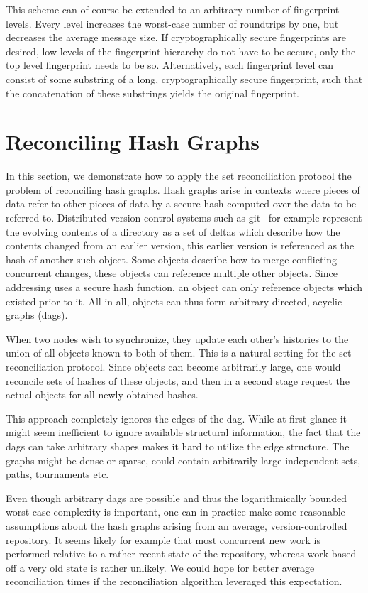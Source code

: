 This scheme can of course be extended to an arbitrary number of fingerprint levels. Every level increases the worst-case number of roundtrips by one, but decreases the average message size. If cryptographically secure fingerprints are desired, low levels of the fingerprint hierarchy do not have to be secure, only the top level fingerprint needs to be so. Alternatively, each fingerprint level can consist of some substring of a long, cryptographically secure fingerprint, such that the concatenation of these substrings yields the original fingerprint.

\section{Reconciling Hash Graphs}
\label{set-reconciliation-graphs}

In this section, we demonstrate how to apply the set reconciliation protocol the problem of reconciling hash graphs. Hash graphs arise in contexts where pieces of data refer to other pieces of data by a secure hash computed over the data to be referred to. Distributed version control systems such as git~\cite{chacon2014pro} for example represent the evolving contents of a directory as a set of deltas which describe how the contents changed from an earlier version, this earlier version is referenced as the hash of another such object. Some objects describe how to merge conflicting concurrent changes, these objects can reference multiple other objects. Since addressing uses a secure hash function, an object can only reference objects which existed prior to it. All in all, objects can thus form arbitrary directed, acyclic graphs (dags).

When two nodes wish to synchronize, they update each other's histories to the union of all objects known to both of them. This is a natural setting for the set reconciliation protocol. Since objects can become arbitrarily large, one would reconcile sets of hashes of these objects, and then in a second stage request the actual objects for all newly obtained hashes.

This approach completely ignores the edges of the dag. While at first glance it might seem inefficient to ignore available structural information, the fact that the dags can take arbitrary shapes makes it hard to utilize the edge structure. The graphs might be dense or sparse, could contain arbitrarily large independent sets, paths, tournaments etc.

Even though arbitrary dags are possible and thus the logarithmically bounded worst-case complexity is important, one can in practice make some reasonable assumptions about the hash graphs arising from an average, version-controlled repository. It seems likely for example that most concurrent new work is performed relative to a rather recent state of the repository, whereas work based off a very old state is rather unlikely. We could hope for better average reconciliation times if the reconciliation algorithm leveraged this expectation.

